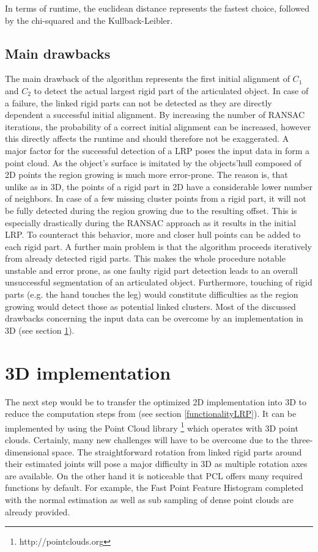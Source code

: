 In terms of runtime, the euclidean distance represents the fastest choice, followed by the chi-squared and the Kullback-Leibler. 


\subsection{Main drawbacks}
The main drawback of the algorithm represents the first initial alignment of $C_1$ and $C_2$ to detect the actual largest rigid part of the articulated object. In case of a failure, the linked rigid parts can not be detected as they are directly dependent a successful initial alignment. By increasing the number of RANSAC iterations, the probability of a correct initial alignment can be increased, however this directly affects the runtime and should therefore not be exaggerated. A major factor for the successful detection of a LRP poses the input data in form a point cloud. As the object's surface is imitated by the objects'hull composed of 2D points the region growing is much more error-prone. The reason is, that unlike as in 3D, the points of a rigid part in 2D have a considerable lower number of neighbors. In case of a few missing cluster points from a rigid part, it will not be fully detected during the region growing due to the resulting offset. This is especially drastically during the RANSAC approach as it results in the initial LRP. To counteract this behavior, more and closer hull points can be added to each rigid part. A further main problem is that the algorithm proceeds iteratively from already detected rigid parts. This makes the whole procedure notable unstable and error prone, as one faulty rigid part detection leads to an overall unsuccessful segmentation of an articulated object. Furthermore, touching of rigid parts (e.g. the hand touches the leg) would constitute difficulties as the region growing would detect those as potential linked clusters. Most of the discussed drawbacks concerning the input data can be overcome by an implementation in 3D (see section \ref{3DImplementation}). 

\section{3D implementation}
\label{3DImplementation}
The next step would be to transfer the optimized 2D implementation into 3D to reduce the computation steps from \cite{guo2016correspondence} (see section \ref{functionalityLRP}). It can be implemented by using the Point Cloud library \footnote{http://pointclouds.org} which operates with 3D point clouds. Certainly, many new challenges will have to be overcome due to the three-dimensional space. The straightforward rotation from linked rigid parts around their estimated joints will pose a major difficulty in 3D as multiple rotation axes are available. On the other hand it is noticeable that PCL offers many required functions by default. For example, the Fast Point Feature Histogram completed with the normal estimation as well as sub sampling of dense point clouds are already provided. 

